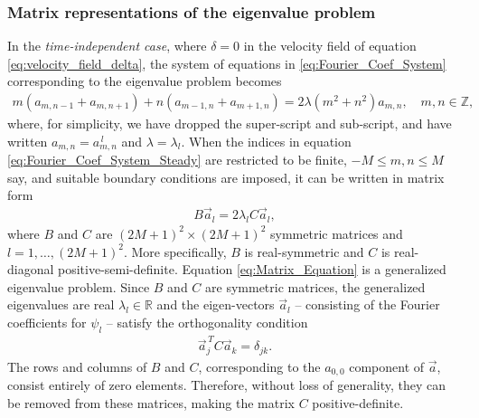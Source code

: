 \documentclass{article}
\newcommand{\0}{\mathbf{0}}
\newcommand{\1}{\mathbf{1}}
\newcommand{\2}{\mathbf{2}}
\newcommand{\3}{\mathbf{3}}
\newcommand{\4}{\mathbf{4}}
\newcommand{\5}{\mathbf{5}}
\newcommand{\6}{\mathbf{6}}
\newcommand{\7}{\mathbf{7}}
\newcommand{\8}{\mathbf{8}}
\begin{document}
\subsubsection{Matrix representations of the eigenvalue problem}
%
In the \emph{time-independent case}, where $\delta=0$ in the velocity field
of equation \eqref{eq:velocity_field_delta}, the system of equations in
\eqref{eq:Fourier_Coef_System} corresponding to the eigenvalue problem
becomes 
%
\begin{align}\label{eq:Fourier_Coef_System_Steady}
  m(a_{m,n-1}+a_{m,n+1})+n(a_{m-1,n}+a_{m+1,n})=2\lambda(m^2+n^2)a_{m,n},
  \quad m,n\in\mathbb{Z},
\end{align}
%
where, for simplicity, we have dropped the super-script and
sub-script, and have written $a_{m,n}=a^{\,l}_{m,n}$ and
$\lambda=\lambda_l$. When the indices in equation
\eqref{eq:Fourier_Coef_System_Steady} are restricted to be finite,
$-M\leq m,n\leq M$ say, and suitable boundary conditions are imposed, it can
be written in matrix form   
%
\begin{align}\label{eq:Matrix_Equation}
  B\vec{a}_l=2\lambda_l C\vec{a}_l,
\end{align}
%
where $B$ and $C$ are $(2M+1)^2\times(2M+1)^2$ symmetric matrices and
$l=1,\ldots,(2M+1)^2$. More specifically, $B$ is real-symmetric and $C$ is
real-diagonal positive-semi-definite. Equation
\eqref{eq:Matrix_Equation} is a generalized eigenvalue problem. Since
$B$ and $C$ are symmetric matrices, the generalized eigenvalues are
real $\lambda_l\in\mathbb{R}$ and the eigen-vectors $\vec{a}_l$ -- consisting
of the Fourier coefficients for $\psi_l$ -- satisfy the orthogonality
condition 
%
\begin{align}\label{eq:Matrix_Ortho}
  \vec{a}_j^{\,T}C\vec{a}_k=\delta_{jk}.
\end{align}
%
The rows and columns of $B$ and $C$, corresponding to the $a_{0,0}$
component of $\vec{a}$, consist entirely of zero elements. Therefore,
without loss of generality, they can be removed from these matrices,
making the matrix $C$ positive-definite. 
\end{document}
